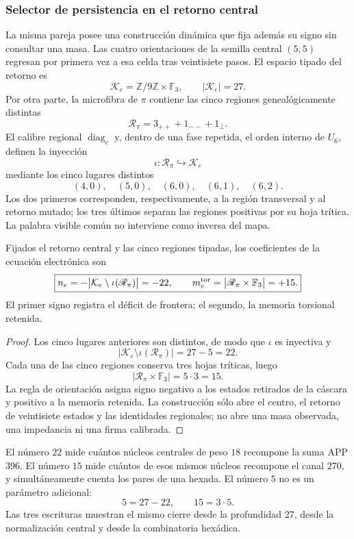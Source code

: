 \subsubsection{Selector de persistencia en el retorno central}

La misma pareja posee una construcción dinámica que fija además su signo sin
consultar una masa. Las cuatro orientaciones de la semilla central
\((5,5)\) regresan por primera vez a esa celda tras veintisiete pasos. El
espacio tipado del retorno es
\[
 \mathcal K_e=\mathbb Z/9\mathbb Z\times\mathbb F_3,
 \qquad |\mathcal K_e|=27.
\]
Por otra parte, la microfibra de \(\pi\) contiene las cinco regiones
genealógicamente distintas
\[
 \mathscr R_\pi=3_{++}+1_{--}+1_{\perp}.
\]
El calibre regional \(\operatorname{diag}_c\) y, dentro de una fase repetida,
el orden interno de \(U_6\), definen la inyección
\[
 \iota:\mathscr R_\pi\hookrightarrow\mathcal K_e
\]
mediante los cinco lugares distintos
\[
 (4,0),\quad(5,0),\quad(6,0),\quad(6,1),\quad(6,2).
\]
Los dos primeros corresponden, respectivamente, a la región transversal y
al retorno mutado; los tres últimos separan las regiones positivas por su
hoja trítica. La palabra visible común no interviene como inversa del mapa.

\begin{theorem}
\label{thm:selector-persistencia-electron-rev7}
Fijados el retorno central y las cinco regiones tipadas, los coeficientes de
la ecuación electrónica son
\[
 \boxed{
 n_e=-\bigl|\mathcal K_e\setminus\iota(\mathscr R_\pi)\bigr|=-22,
 \qquad
 m_e^{\rm tor}=\bigl|\mathscr R_\pi\times\mathbb F_3\bigr|=+15.}
\]
El primer signo registra el déficit de frontera; el segundo, la memoria
torsional retenida.
\end{theorem}

\begin{proof}
Los cinco lugares anteriores son distintos, de modo que \(\iota\) es
inyectiva y
\[
 |\mathcal K_e\setminus\iota(\mathscr R_\pi)|=27-5=22.
\]
Cada una de las cinco regiones conserva tres hojas tríticas, luego
\[
 |\mathscr R_\pi\times\mathbb F_3|=5\cdot3=15.
\]
La regla de orientación asigna signo negativo a los estados retirados de la
cáscara y positivo a la memoria retenida. La construcción sólo abre el
centro, el retorno de veintisiete estados y las identidades regionales; no
abre una masa observada, una impedancia ni una firma calibrada.
\end{proof}

El número \(22\) mide cuántos núcleos centrales de peso \(18\) recompone la
suma APP \(396\). El número \(15\) mide cuántos de esos mismos núcleos
recompone el canal \(270\), y simultáneamente cuenta los pares de una
hexada. El número \(5\) no es un parámetro adicional:
\[
 5=27-22,\qquad 15=3\cdot5.
\]
Las tres escrituras muestran el mismo cierre desde la profundidad 27,
desde la normalización central y desde la combinatoria hexádica.

